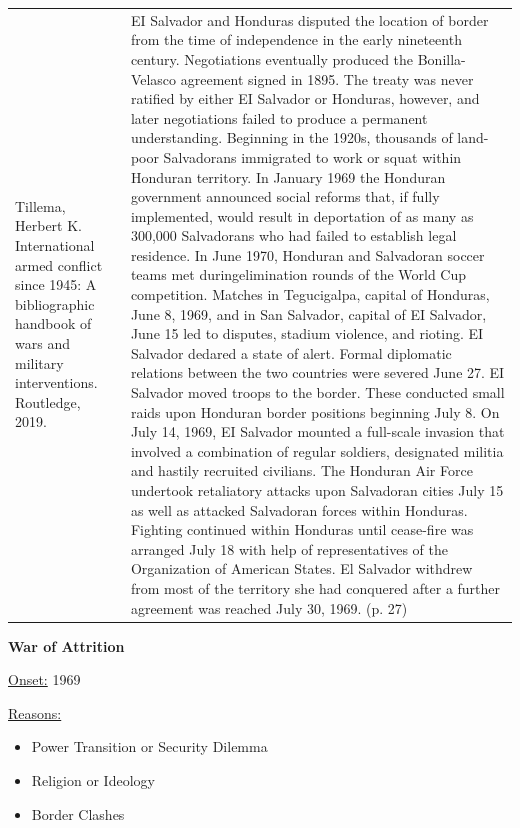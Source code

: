 {\begin{longtable}{p{}p{}}
\\
Tillema, Herbert K. International armed conflict since 1945: A bibliographic handbook of wars and military interventions. Routledge, 2019. & EI Salvador and Honduras disputed the location of border from the time of independence in the early nineteenth century. Negotiations eventually produced the Bonilla-Velasco agreement signed in 1895. The treaty was never ratified by either EI Salvador or Honduras, however, and later negotiations failed to produce a permanent understanding. Beginning in the 1920s, thousands of land-poor Salvadorans immigrated to work or squat within Honduran territory. In January 1969 the Honduran government announced social reforms that, if fully implemented, would result in deportation of as many as 300,000 Salvadorans who had failed to establish legal residence. In June 1970, Honduran and Salvadoran soccer teams met duringelimination rounds of the World Cup competition. Matches in Tegucigalpa, capital of Honduras, June 8, 1969, and in San Salvador, capital of EI Salvador, June 15 led to disputes, stadium violence, and rioting. EI Salvador dedared a state of alert. Formal diplomatic relations between the two countries were severed June 27. EI Salvador moved troops to the border. These conducted small raids upon Honduran border positions beginning July 8. On July 14, 1969, EI Salvador mounted a full-scale invasion that involved a combination of regular soldiers, designated militia and hastily recruited civilians. The Honduran Air Force undertook retaliatory attacks upon Salvadoran cities July 15 as well as attacked Salvadoran forces within Honduras. Fighting continued within Honduras until cease-fire was arranged July 18 with help of representatives of the Organization of American States. El Salvador withdrew from most of the territory she had conquered after a further agreement was reached July 30, 1969. (p. 27)
\\
\end{longtable}}
\clearpage
         \textbf{War of Attrition} 

          \underline{Onset:} 1969         

\underline{Reasons:}
\begin{itemize}
\item Power Transition or Security Dilemma
\item Religion or Ideology
\item Border Clashes
\end{itemize}

